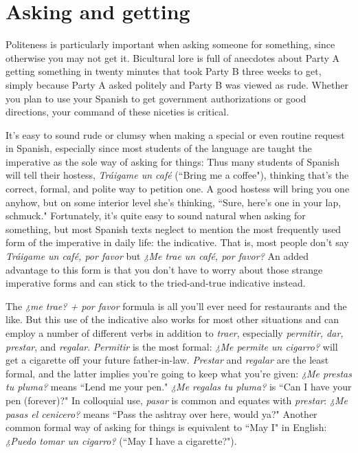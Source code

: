 \section{Asking and getting}

Politeness is particularly important when asking someone for
something, since otherwise you may not get it. Bicultural lore is full of
anecdotes about Party A getting something in twenty minutes that
took Party B three weeks to get, simply because Party A asked politely
and Party B was viewed as rude. Whether you plan to use your Spanish
to get government authorizations or good directions, your command of
these niceties is critical.

It's easy to sound rude or clumsy when making a special or
even routine request in Spanish, especially since most students of the
language are taught the imperative as the sole way of asking for things:
Thus many students of Spanish will tell their hostess, \emph{Tráigame un café} (``Bring me a coffee"), thinking that's the correct, formal, and polite way to petition one. A good hostess will bring you one anyhow,
but on some interior level she's thinking, ``Sure, here's one in your lap,
schmuck." Fortunately, it's quite easy to sound natural when asking
for something, but most Spanish texts neglect to mention the most frequently used form of the imperative in daily life: the indicative. That
is, most people don't say \emph{Tráigame un café, por favor} but \emph{¿Me trae un
café, por favor?} An added advantage to this form is that you don't have
to worry about those strange imperative forms and can stick to the
tried-and-true indicative instead.

The \emph{¿me trae? + por favor} formula is all you'll ever need for
restaurants and the like. But this use of the indicative also works for
most other situations and can employ a number of different verbs in
addition to \emph{traer}, especially \emph{permitir, dar, prestar}, and \emph{regalar}. \emph{Permitir} is the most formal: \emph{¿Me permite un cigarro?} will get a cigarette off
your future father-in-law. \emph{Prestar} and \emph{regalar} are the least formal, and
the latter implies you're going to keep what you're given: \emph{¿Me prestas
tu pluma?} means ``Lend me your pen." \emph{¿Me regalas tu pluma?} is ``Can
I have your pen (forever)?" In colloquial use, \emph{pasar} is common and
equates with \emph{prestar}: \emph{¿Me pasas el cenicero?} means ``Pass the ashtray
over here, would ya?" Another common formal way of asking for
things is equivalent to ``May I" in English: \emph{¿Puedo tomar un cigarro?}
(``May I have a cigarette?").

